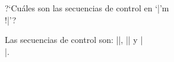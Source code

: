  


\bigskip

 ?`Cu\'ales son las secuencias de control en 
`|\I'm \\!|'?

\bigskip

 Las secuencias de control son: |\I|, 
|\exercise| y |\\|\/.

\bye